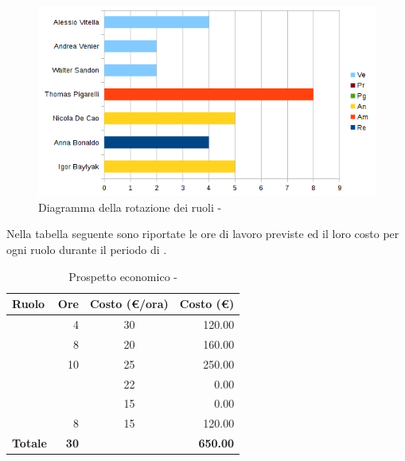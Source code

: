\documentclass[12pt,a4paper]{article}
\begin{document}
\begin{center}
	\begin{figure}[H]
		\centering	
		\includegraphics[width=\textwidth]{../img/diagrammaBarreAnalisiDiDettaglioRotazioneRuoli.png}
		\caption{Diagramma della rotazione dei ruoli - \FAD{}}
	\end{figure}
\end{center}

\newpage
{}
Nella tabella seguente sono riportate le ore di lavoro previste ed il loro costo per ogni ruolo durante il periodo di \FAD{}.

\begin{table}[H]
	\begin{center}
		\begin{tabular}{l r c r}
			\toprule
			\textbf{Ruolo}	& \textbf{Ore} & \textbf{Costo (\euro/ora)}	& \textbf{Costo (\euro)} \\ \midrule
			\midrule
			\RE{} & 4 & 30 & 120.00 \\ \midrule
			\AM{} & 8 & 20 & 160.00 \\ \midrule
			\AN{} & 10 & 25 & 250.00 \\ \midrule
			\PG{} & & 22 & 0.00 \\ \midrule
			\PR{} & & 15 & 0.00 \\ \midrule
			\VR{} & 8 & 15 & 120.00 \\ \midrule
			\textbf{Totale} & \textbf{30} &  & \textbf{650.00} \\
			\bottomrule
		\end{tabular}
		\caption{Prospetto economico - \FAD{}}
	\end{center}
\end{table}
\end{document}

